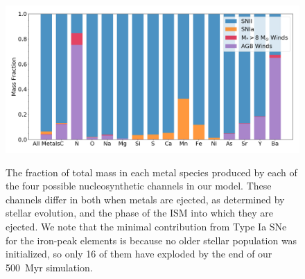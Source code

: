 \documentclass[twocolumn]{aastex61}
\begin{document}
\begin{figure}
\centering
\includegraphics[width=0.95\linewidth]{species_bar_sources.png}\\
\caption{The fraction of total mass in each metal species produced by each of the four possible nucleosynthetic channels in our model. These channels differ in both when metals are ejected, as determined by stellar evolution, and the phase of the ISM into which they are ejected.
We note that the minimal contribution from Type Ia SNe for the iron-peak elements is because  no older stellar population was initialized, so only 16 of them have exploded by the end of our 500~Myr simulation.}

\label{fig:species_sources}
\end{figure}
\end{document}
